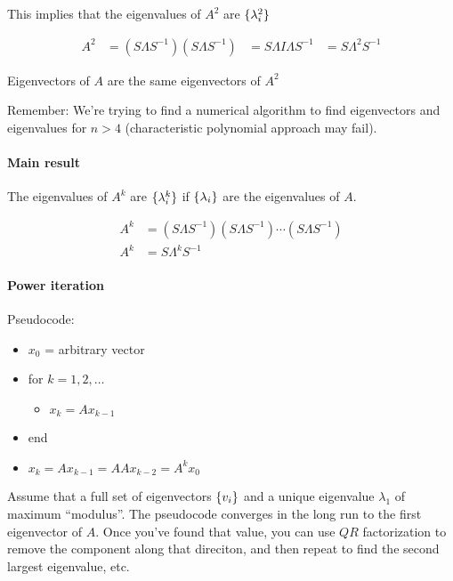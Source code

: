 This implies that the eigenvalues of $A^2$ are $\{\lambda_i^2\}$

\begin{align*}
  A^2 &= (S \Lambda S^{-1}) (S \Lambda S^{-1})
  &= S \Lambda I \Lambda S^{-1}
  &= S \Lambda^{2} S^{-1}
\end{align*}

Eigenvectors of $A$ are the same eigenvectors of $A^{2}$

Remember: We're trying to find a numerical algorithm to find eigenvectors and eigenvalues for $n > 4$ (characteristic polynomial approach may fail).

\paragraph{Main result} The eigenvalues of $A^k$ are $\{\lambda_i^k\}$ if $\{\lambda_i\}$ are the eigenvalues of $A$.

\begin{align*}
  A^k &= (S \Lambda S^{-1})(S \Lambda S^{-1}) \cdots (S \Lambda S^{-1})\\
  A^k &= S \Lambda^{k} S^{-1}
\end{align*}

\paragraph{Power iteration} Pseudocode:
\begin{itemize}
  \item $x_0$ = arbitrary vector
  \item for $k=1,2,\dots$
  \begin{itemize}
    \item $x_k = Ax_{k-1}$
  \end{itemize}
  \item end
  \item $x_k = Ax_{k-1} = AAx_{k-2} = A^{k}x_0$
\end{itemize}

Assume that a full set of eigenvectors $\{v_i\}$ and a unique eigenvalue $\lambda_1$ of maximum ``modulus''. The pseudocode converges in the long run to the first eigenvector of $A$. Once you've found that value, you can use $QR$ factorization to remove the component along that direciton, and then repeat to find the second largest eigenvalue, etc.